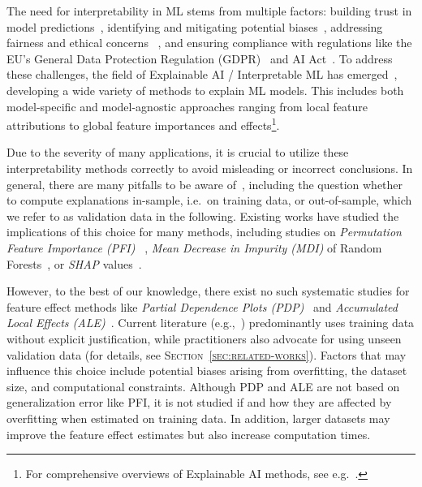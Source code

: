 \documentclass[runningheads]{llncs}
\begin{document}
The need for interpretability in ML stems from multiple factors: building trust in
model predictions~\cite{ribeiro_why_2016,teach_analysis_1981},  identifying and mitigating
potential biases~\cite{guidotti_survey_2019}, addressing fairness and ethical concerns
~\cite{lipton_mythos_2018}, and ensuring compliance with regulations like the
EU's General Data Protection Regulation (GDPR)~\cite{gdpr2016} and AI
Act~\cite{euaia2024}. To address these challenges, the field of Explainable AI
/ Interpretable ML has emerged~\cite{adadi_peeking_2018}, developing a
wide variety of methods to explain ML models. This includes both model-specific and
model-agnostic approaches ranging from local feature attributions to global
feature importances and effects\footnote{For comprehensive overviews of Explainable AI
    methods, see
    e.g.~\cite{adadi_peeking_2018,kamath_introduction_2021,molnar_interpretable_2022}.}.

Due to the severity of many applications, it is crucial to utilize these
interpretability methods correctly to avoid misleading or incorrect conclusions.
In general, there are many pitfalls to be aware of~\cite{molnar_general_2022},
including the question whether to compute explanations in-sample, i.e.\ on training data, or
out-of-sample, which we refer to as validation data in the following. Existing
works have studied the implications of this choice for many methods, including
studies on \textit{Permutation Feature Importance (PFI) }~\cite{molnar_general_2022},
\textit{Mean Decrease in Impurity (MDI)} of
Random Forests~\cite{loecher_debiasing_2022}, or \textit{SHAP}
values~\cite{loecher_debiasing_2024}.

However, to the best of our knowledge, there exist no such systematic studies
for feature effect methods like \textit{Partial Dependence Plots
    (PDP)}~\cite{friedman_greedy_2001} and \textit{Accumulated Local Effects
    (ALE)}~\cite{apley_visualizing_2020}. Current literature
(e.g.,~\cite{apley_visualizing_2020,friedman_greedy_2001,molnar_interpretable_2022})
predominantly uses training data without explicit justification, while
practitioners also advocate for using unseen validation data (for details, see
\textsc{Section~\ref{sec:related-works}}). Factors that may influence this
choice include potential biases arising from overfitting, the dataset size, and
computational constraints. Although PDP and ALE are not based on generalization
error like PFI, it is not studied if and how they are affected by overfitting
when estimated on training data. In addition, larger datasets may improve the
feature effect estimates but also increase computation times.\\
\end{document}

